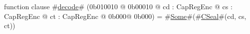 function clause #\hyperref[sailMIPSzdecode]{decode}# (0b010010 @ 0b00010 @ cd : CapRegEnc @ cs : CapRegEnc @ ct : CapRegEnc @ 0b000@ 0b000) = #\hyperref[sailMIPSzSome]{Some}#(#\hyperref[sailMIPSzCSeal]{CSeal}#(cd, cs, ct))
